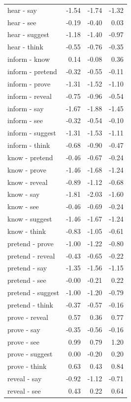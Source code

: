 \begin{longtable}{lrrr}
  hear - say & -1.54 & -1.74 & -1.32 \\ 
  hear - see & -0.19 & -0.40 & 0.03 \\ 
  hear - suggest & -1.18 & -1.40 & -0.97 \\ 
  hear - think & -0.55 & -0.76 & -0.35 \\ 
  inform - know & 0.14 & -0.08 & 0.36 \\ 
  inform - pretend & -0.32 & -0.55 & -0.11 \\ 
  inform - prove & -1.31 & -1.52 & -1.10 \\ 
  inform - reveal & -0.75 & -0.96 & -0.54 \\ 
  inform - say & -1.67 & -1.88 & -1.45 \\ 
  inform - see & -0.32 & -0.54 & -0.10 \\ 
  inform - suggest & -1.31 & -1.53 & -1.11 \\ 
  inform - think & -0.68 & -0.90 & -0.47 \\ 
  know - pretend & -0.46 & -0.67 & -0.24 \\ 
  know - prove & -1.46 & -1.68 & -1.24 \\ 
  know - reveal & -0.89 & -1.12 & -0.68 \\ 
  know - say & -1.81 & -2.03 & -1.60 \\ 
  know - see & -0.46 & -0.69 & -0.24 \\ 
  know - suggest & -1.46 & -1.67 & -1.24 \\ 
  know - think & -0.83 & -1.05 & -0.61 \\ 
  pretend - prove & -1.00 & -1.22 & -0.80 \\ 
  pretend - reveal & -0.43 & -0.65 & -0.22 \\ 
  pretend - say & -1.35 & -1.56 & -1.15 \\ 
  pretend - see & -0.00 & -0.21 & 0.22 \\ 
  pretend - suggest & -1.00 & -1.20 & -0.79 \\ 
  pretend - think & -0.37 & -0.57 & -0.16 \\ 
  prove - reveal & 0.57 & 0.36 & 0.77 \\ 
  prove - say & -0.35 & -0.56 & -0.16 \\ 
  prove - see & 0.99 & 0.79 & 1.20 \\ 
  prove - suggest & 0.00 & -0.20 & 0.20 \\ 
  prove - think & 0.63 & 0.43 & 0.84 \\ 
  reveal - say & -0.92 & -1.12 & -0.71 \\ 
  reveal - see & 0.43 & 0.22 & 0.64 \\ 

\end{longtable}
